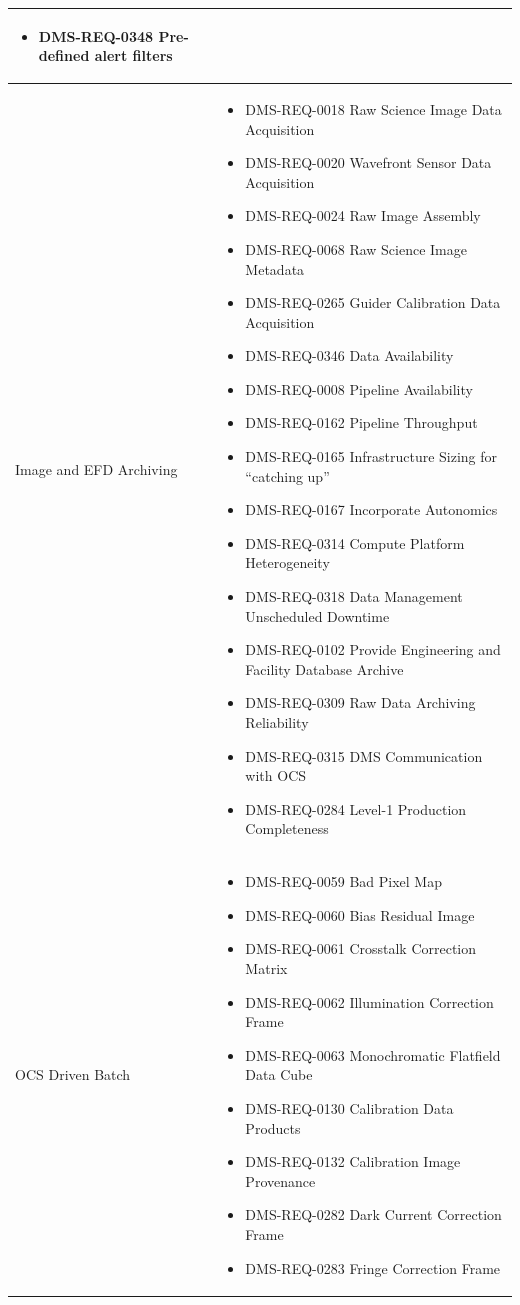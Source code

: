 \documentclass[DM,lsstdraft,toc]{lsstdoc}
\begin{document}
\begin{xtabular}{|p{0.1\textwidth}|p{0.85\textwidth}|}
\begin{itemize}
\item DMS-REQ-0348 Pre-defined alert filters
\end{itemize} \\ \hline
Image and EFD Archiving &
\begin{itemize} \item DMS-REQ-0018 Raw Science Image Data Acquisition
\item DMS-REQ-0020 Wavefront Sensor Data Acquisition
\item DMS-REQ-0024 Raw Image Assembly
\item DMS-REQ-0068 Raw Science Image Metadata
\item DMS-REQ-0265 Guider Calibration Data Acquisition
\item DMS-REQ-0346 Data Availability
\item DMS-REQ-0008 Pipeline Availability
\item DMS-REQ-0162 Pipeline Throughput
\item DMS-REQ-0165 Infrastructure Sizing for ``catching up''
\item DMS-REQ-0167 Incorporate Autonomics
\item DMS-REQ-0314 Compute Platform Heterogeneity
\item DMS-REQ-0318 Data Management Unscheduled Downtime
\item DMS-REQ-0102 Provide Engineering and Facility Database Archive
\item DMS-REQ-0309 Raw Data Archiving Reliability
\item DMS-REQ-0315 DMS Communication with OCS
\item DMS-REQ-0284 Level-1 Production Completeness \end{itemize} \\ \hline
OCS Driven Batch &
\begin{itemize} \item DMS-REQ-0059 Bad Pixel Map
\item DMS-REQ-0060 Bias Residual Image
\item DMS-REQ-0061 Crosstalk Correction Matrix
\item DMS-REQ-0062 Illumination Correction Frame
\item DMS-REQ-0063 Monochromatic Flatfield Data Cube
\item DMS-REQ-0130 Calibration Data Products
\item DMS-REQ-0132 Calibration Image Provenance
\item DMS-REQ-0282 Dark Current Correction Frame
\item DMS-REQ-0283 Fringe Correction Frame

\end{itemize}
\end{xtabular}
\end{document}
